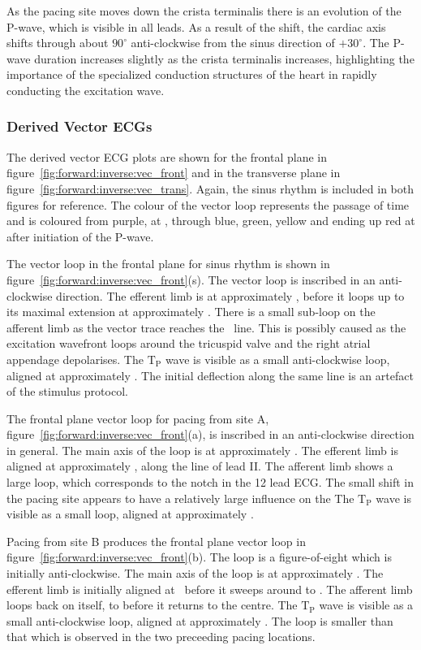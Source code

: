 As the pacing site moves down the crista terminalis there is an evolution of the
P-wave, which is visible in all leads.
As a result of the shift, the cardiac axis shifts through about $90^\circ$
anti-clockwise from the sinus direction of $+30^\circ$.
The P-wave duration increases slightly as the crista terminalis increases,
highlighting the importance of the specialized conduction structures of the
heart in rapidly conducting the excitation wave.


\subsubsection{Derived Vector ECGs}

The derived vector ECG plots are shown for the frontal plane in
figure~\ref{fig:forward:inverse:vec_front} and in the transverse plane in
figure~\ref{fig:forward:inverse:vec_trans}.
Again, the sinus rhythm is included in both figures for reference.
The colour of the vector loop represents the passage of time and is coloured
from purple, at , through blue, green, yellow and ending up red at
 after initiation of the P-wave.

The vector loop in the frontal plane for sinus rhythm is shown in
figure~\ref{fig:forward:inverse:vec_front}(s).
The vector loop is inscribed in an anti-clockwise direction.
The efferent limb is at approximately , before it loops up to its
maximal extension at approximately .
There is a small sub-loop on the afferent limb as the vector trace reaches the
\ line.
This is possibly caused as the excitation wavefront loops around the tricuspid
valve and the right atrial appendage depolarises.
The $\text{T}_{\text{P}}$ wave is visible as a small anti-clockwise loop,
aligned at approximately .
The initial deflection along the same line is an artefact of the stimulus
protocol.

The frontal plane vector loop for pacing from site A,
figure~\ref{fig:forward:inverse:vec_front}(a), is inscribed in an anti-clockwise
direction in general.
The main axis of the loop is at approximately .
The efferent limb is aligned at approximately , along the line of lead
II.
The afferent limb shows a large loop, which corresponds to the notch in the 12
lead ECG.
The small shift in the pacing site appears to have a relatively large influence
on the 
The $\text{T}_{\text{P}}$ wave is visible as a small loop, aligned at
approximately .

Pacing from site B produces the frontal plane vector loop in
figure~\ref{fig:forward:inverse:vec_front}(b).
The loop is a figure-of-eight which is initially anti-clockwise.
The main axis of the loop is at approximately .
The efferent limb is initially aligned at \ before it sweeps around to
.
The afferent limb loops back on itself, to  before it returns to the
centre.
The $\text{T}_{\text{P}}$ wave is visible as a small anti-clockwise loop, aligned at
approximately .
The loop is smaller than that which is observed in the two preceeding pacing
locations.


